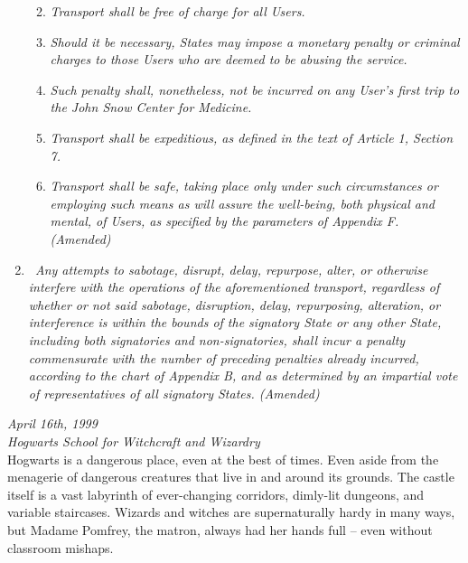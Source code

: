 \begin{enumerate}
  \begin{enumerate}
  \def\labelenumii{\arabic{enumii}.}
  \tightlist
  \item
    \emph{Transport shall be free of charge for all Users.}
  \item
    \emph{Should it be necessary, States may impose a monetary penalty
    or criminal charges to those Users who are deemed to be abusing the
    service.}
  \item
    \emph{Such penalty shall, nonetheless, not be incurred on any User's
    first trip to the John Snow Center for Medicine.}
  \item
    \emph{Transport shall be expeditious, as defined in the text of
    Article 1, Section 7.}
  \item
    \emph{Transport shall be safe, taking place only under such
    circumstances or employing such means as will assure the well-being,
    both physical and mental, of Users, as specified by the parameters
    of Appendix F. (Amended)}
  \end{enumerate}
\item
  \texttt{~}\emph{Any attempts to sabotage, disrupt, delay, repurpose,
  alter, or otherwise interfere with the operations of the
  aforementioned transport, regardless of whether or not said sabotage,
  disruption, delay, repurposing, alteration, or interference is within
  the bounds of the signatory State or any other State, including both
  signatories and non-signatories, shall incur a penalty commensurate
  with the number of preceding penalties already incurred, according to
  the chart of Appendix B, and as determined by an impartial vote of
  representatives of all signatory States. (Amended)}
\end{enumerate}


\mybreak

\emph{April 16th, 1999}\\
\emph{Hogwarts School for Witchcraft and Wizardry}\\

Hogwarts is a dangerous place, even at the best of times. Even aside
from the menagerie of dangerous creatures that live in and around its
grounds. The castle itself is a vast labyrinth of ever-changing
corridors, dimly-lit dungeons, and variable staircases. Wizards and
witches are supernaturally hardy in many ways, but Madame Pomfrey, the
matron, always had her hands full -- even without classroom mishaps.

